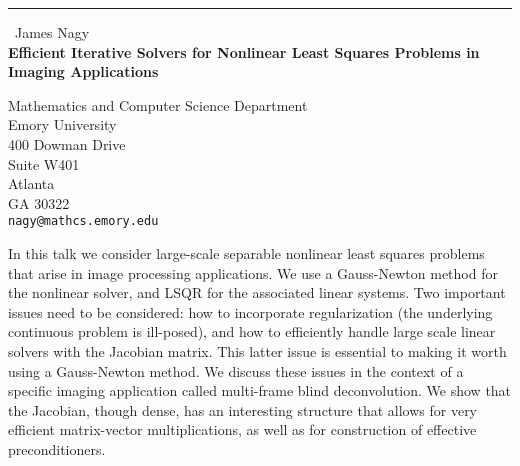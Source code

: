 \documentclass{report}
\begin{document}
\begin{center}
\rule{6in}{1pt} \
{\large James Nagy \\
{\bf Efficient Iterative Solvers for Nonlinear Least Squares Problems in Imaging Applications}}

Mathematics and Computer Science Department \\ Emory University \\ 400 Dowman Drive \\ Suite W401 \\ Atlanta \\ GA 30322
\\
{\tt nagy@mathcs.emory.edu}\end{center}

In this talk we consider large-scale separable nonlinear least squares
problems that arise in image processing applications. We use a
Gauss-Newton method for the nonlinear solver, and LSQR for the
associated linear systems. Two important issues need to be
considered: how to incorporate regularization (the underlying
continuous problem is ill-posed), and how to efficiently handle large
scale linear solvers with the Jacobian matrix. This latter issue is
essential to making it worth using a Gauss-Newton method. We discuss
these issues in the context of a specific imaging application called
multi-frame blind deconvolution. We show that the Jacobian,
though dense, has an interesting structure that allows for very
efficient matrix-vector multiplications, as well as for construction
of effective preconditioners.
\end{document}
